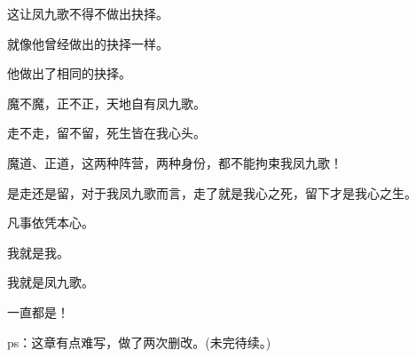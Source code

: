 \begin{this_body}
这让凤九歌不得不做出抉择。

就像他曾经做出的抉择一样。

他做出了相同的抉择。

魔不魔，正不正，天地自有凤九歌。

走不走，留不留，死生皆在我心头。

魔道、正道，这两种阵营，两种身份，都不能拘束我凤九歌！

是走还是留，对于我凤九歌而言，走了就是我心之死，留下才是我心之生。

凡事依凭本心。

我就是我。

我就是凤九歌。

一直都是！

ps：这章有点难写，做了两次删改。(未完待续。)

\end{this_body}

